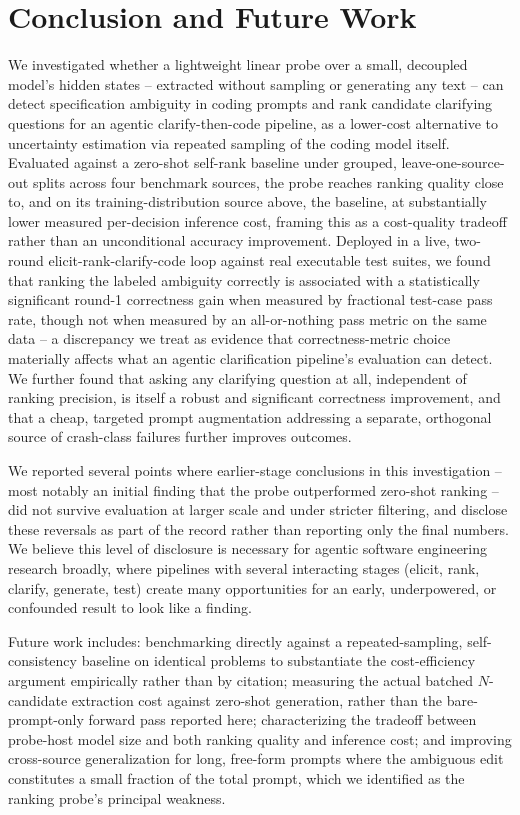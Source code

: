 \section{Conclusion and Future Work}
\label{sec:conclusion}

We investigated whether a lightweight linear probe over a small,
decoupled model's hidden states -- extracted without sampling or
generating any text -- can detect specification ambiguity in coding
prompts and rank candidate clarifying questions for an agentic
clarify-then-code pipeline, as a lower-cost alternative to uncertainty
estimation via repeated sampling of the coding model itself. Evaluated
against a zero-shot self-rank baseline under grouped, leave-one-source-out
splits across four benchmark sources, the probe reaches ranking quality
close to, and on its training-distribution source above, the baseline, at
substantially lower measured per-decision inference cost, framing this as
a cost-quality tradeoff rather than an unconditional accuracy improvement.
Deployed in a live, two-round elicit-rank-clarify-code loop against real
executable test suites, we found that ranking the labeled ambiguity
correctly is associated with a statistically significant round-1
correctness gain when measured by fractional test-case pass rate, though
not when measured by an all-or-nothing pass metric on the same data -- a
discrepancy we treat as evidence that correctness-metric choice materially
affects what an agentic clarification pipeline's evaluation can detect.
We further found that asking any clarifying question at all, independent
of ranking precision, is itself a robust and significant correctness
improvement, and that a cheap, targeted prompt augmentation addressing a
separate, orthogonal source of crash-class failures further improves
outcomes.

We reported several points where earlier-stage conclusions in this
investigation -- most notably an initial finding that the probe
outperformed zero-shot ranking -- did not survive evaluation at larger
scale and under stricter filtering, and disclose these reversals as part
of the record rather than reporting only the final numbers. We believe
this level of disclosure is necessary for agentic software engineering
research broadly, where pipelines with several interacting stages (elicit,
rank, clarify, generate, test) create many opportunities for an early,
underpowered, or confounded result to look like a finding.

Future work includes: benchmarking directly against a repeated-sampling,
self-consistency baseline on identical problems to substantiate the
cost-efficiency argument empirically rather than by citation; measuring
the actual batched $N$-candidate extraction cost against zero-shot
generation, rather than the bare-prompt-only forward pass reported here;
characterizing the tradeoff between probe-host model size and both ranking
quality and inference cost; and improving cross-source generalization for
long, free-form prompts where the ambiguous edit constitutes a small
fraction of the total prompt, which we identified as the ranking probe's
principal weakness.
